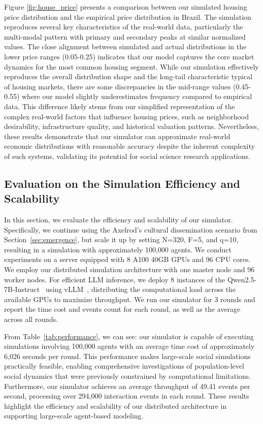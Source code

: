 \documentclass{article}
\theoremstyle{definition}
\theoremstyle{theorem}
\theoremstyle{proof}
\theoremstyle{remark}
\begin{document}
     Figure \ref{fig:house_price} presents a comparison between our simulated housing price distribution and the empirical price distribution in Brazil. The simulation reproduces several key characteristics of the real-world data, particularly the multi-modal pattern with primary and secondary peaks at similar normalized values. The close alignment between simulated and actual distributions in the lower price ranges (0.05-0.25) indicates that our model captures the core market dynamics for the most common housing segment. While our simulation effectively reproduces the overall distribution shape and the long-tail characteristic typical of housing markets, there are some discrepancies in the mid-range values (0.45-0.55) where our model slightly underestimates frequency compared to empirical data. This difference likely stems from our simplified representation of the complex real-world factors that influence housing prices, such as neighborhood desirability, infrastructure quality, and historical valuation patterns. Nevertheless, these results demonstrate that our simulator can approximate real-world economic distributions with reasonable accuracy despite the inherent complexity of such systems, validating its potential for social science research applications.


    \subsection{Evaluation on the Simulation Efficiency and Scalability}
    In this section, we evaluate the efficiency and scalability of our simulator. Specifically, we continue using the Axelrod’s cultural dissemination scenario from Section~\ref{sec:emergence}, but scale it up by setting N=320, F=5, and q=10, resulting in a simulation with approximately 100,000 agents.
    We conduct experiments on a server equipped with 8 A100 40GB GPUs and 96 CPU cores. We employ our distributed simulation architecture with one master node and 96 worker nodes. For efficient LLM inference, we deploy 8 instances of the Qwen2.5-7B-Instruct~\cite{yang2024qwen2} using vLLM~\cite{kwon2023efficient}, distributing the computational load across the available GPUs to maximize throughput.
    We run our simulator for 3 rounds and report the time cost and events count for each round, as well as the average across all rounds.

    From Table~\ref{tab:performance}, we can see: our simulator is capable of executing simulations involving 100,000 agents with an average time cost of approximately 6,026 seconds per round. This performance makes large-scale social simulations practically feasible, enabling comprehensive investigations of population-level social dynamics that were previously constrained by computational limitations. Furthermore, our simulator achieves an average throughput of 49.41 events per second, processing over 294,000 interaction events in each round. These results highlight the efficiency and scalability of our distributed architecture in supporting large-scale agent-based modeling.
\end{document}
